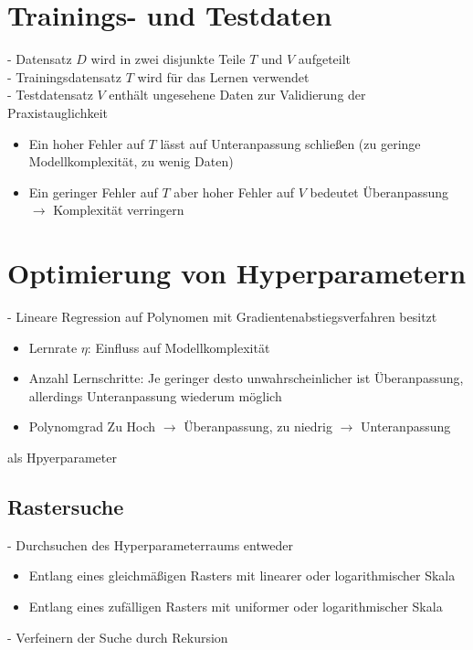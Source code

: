 \documentclass{report}
\begin{document}
  \section{Trainings- und Testdaten}	
  - Datensatz $D$ wird in zwei disjunkte Teile $T$ und $V$ aufgeteilt\\	
  - Trainingsdatensatz $T$ wird für das Lernen verwendet\\	
  - Testdatensatz $V$ enthält ungesehene Daten zur Validierung der Praxistauglichkeit\	
  \vspace*{-1.25em}	
  \begin{itemize}	
    \item Ein hoher Fehler auf $T$ lässt auf Unteranpassung schließen (zu geringe Modellkomplexität, zu wenig Daten)	
    \item Ein geringer Fehler auf $T$ aber hoher Fehler auf $V$ bedeutet Überanpassung $\rightarrow$ Komplexität verringern	
  \end{itemize}	
  
  \section{Optimierung von Hyperparametern}	
  - Lineare Regression auf Polynomen mit Gradientenabstiegsverfahren besitzt\\	
  \vspace*{-1.25em}	
  \begin{itemize}	
    \item Lernrate $\eta$: Einfluss auf Modellkomplexität	
    \item Anzahl Lernschritte: Je geringer desto unwahrscheinlicher ist Überanpassung, allerdings Unteranpassung wiederum möglich	
    \item Polynomgrad Zu Hoch $\rightarrow$ Überanpassung, zu niedrig $\rightarrow$ Unteranpassung	
  \end{itemize}	
  als Hpyerparameter	
  
  \subsection{Rastersuche}	
  - Durchsuchen des Hyperparameterraums entweder\\	
  \vspace*{-1.25em}	
  \begin{itemize}	
    \item Entlang eines gleichmäßigen Rasters mit linearer oder logarithmischer Skala	
    \item Entlang eines zufälligen Rasters mit uniformer oder logarithmischer Skala	
  \end{itemize}	
  - Verfeinern der Suche durch Rekursion	
  
\end{document}
